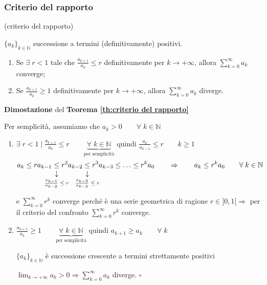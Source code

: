 \subsubsection{Criterio del rapporto}
\begin{theorem} (criterio del rapporto) \label{th:criterio del rapporto}
	
	$\{a_k\}_{k\in\mathbb{N}}$ successione a termini (definitivamente) positivi.
	\begin{enumerate}
		\item Se $\exists \; r<1$ tale che $\frac{a_{k+1}}{a_k} \leq r$ definitivamente per $k\rightarrow+\infty$, allora $\sum_{k=0}^\infty a_k$ converge;
		\item Se $\frac{a_{k+1}}{a_k} \geq 1$ definitivamente per $k\rightarrow+\infty$, allora $\sum_{k=0}^\infty a_k$ diverge.
	\end{enumerate}
\end{theorem}


\begin{dembar}
	\textbf{Dimostazione} del \textbf{Teorema \ref{th:criterio del rapporto}}
	
	Per semplicità, assumiamo che $a_k > 0 \qquad \forall \; k \in\mathbb{N}$
	
	\begin{enumerate}
		\item  $\exists \; r < 1 \; \bigg| \; \frac{a_{k+1}}{a_k} \leq r \qquad \underbrace{\forall \; k\in\mathbb{N}}_{\text{per semplicità}} $ quindi $\frac{a_k}{a_{k-1}} \leq r \qquad k \geq 1$		
		\begin{equation*}
			a_k \leq r a_{k-1} \; \vertarrowbox{\leq}{$\frac{a_{k-1}}{a_{k-2}} \leq r$} \; r^2 a_{k-2} \; \vertarrowbox{\leq}{$\frac{a_{k-2}}{a_{k-3}} \leq r$} \; r^3 a_{k-3} \leq \ldots \leq r^k a_0 \qquad \Rightarrow \qquad a_k \leq r^k a_0 \qquad \forall \; k\in\mathbb{N}
		\end{equation*}
		
		e $\sum_{k=0}^\infty r^k$ converge perché è una serie geometrica di ragione $r\in ]0,1[ \Rightarrow$ per il criterio del confronto $\sum_{k=0}^\infty r^k$ converge.
		
		\item $\frac{a_{k+1}}{a_k} \geq 1 \qquad \underbrace{\forall \; k\in\mathbb{N}}_{\text{per semplicità}}$ quindi $a_{k+1}\geq a_k \qquad \forall \; k$
		
		$\{a_k \}_{k\in\mathbb{N}}$ è successione crescente a termini strettamente positivi 
		
		$\lim_{k\rightarrow+\infty} a_k > 0 \Rightarrow \sum_{k=0}^\infty a_k$ diverge. $\square$ 	
	\end{enumerate}
\end{dembar}


